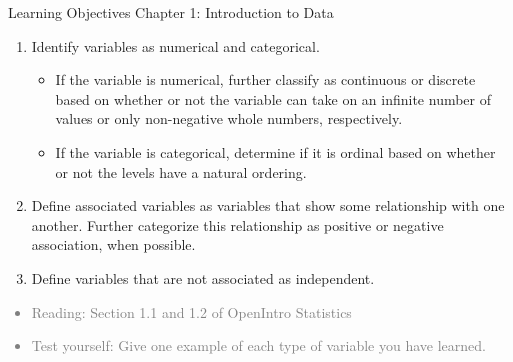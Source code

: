\documentclass[11pt]{article}
\newcommand{\gray}[1]{\textcolor{gray}{#1}}
\begin{document}
{\LARGE \textcolor{oiB}{Learning Objectives \hfill Chapter 1: Introduction to Data}} \\

\begin{enumerate}
\renewcommand\labelenumi{\textcolor{light}{\textbf{LO \theenumi.}}}
\item Identify variables as numerical and categorical.
\begin{itemize}
\renewcommand{\labelitemi}{{\textcolor{dark}{{\tiny $\blacksquare$}}}}
\item If the variable is numerical, further classify as continuous or discrete based on whether or not the variable can take on an infinite number of values or only non-negative whole numbers, respectively.
\item If the variable is categorical, determine if it is ordinal based on whether or not the levels have a natural ordering. 
\end{itemize}

\item Define associated variables as variables that show some relationship with one another. Further categorize this relationship as positive or negative association, when possible.

\item Define variables that are not associated as independent.

\end{enumerate}

\gray{
{\it
\vspace{-0.75cm}
\begin{itemize}
\renewcommand{\labelitemi}{{\textcolor{dark}{$\ast$}}}
\item Reading: Section 1.1 and 1.2 of OpenIntro Statistics
\item Test yourself: Give one example of each type of variable you have learned. \\
\end{itemize}
}}

%

\vspace{0.5cm}

%
\end{document}
